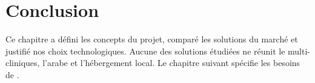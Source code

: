 \section*{Conclusion}
Ce chapitre a défini les concepts du projet, comparé les solutions du marché et justifié nos choix technologiques. Aucune des solutions étudiées ne réunit le multi-cliniques, l'arabe et l'hébergement local. Le chapitre suivant spécifie les besoins de \nomprojet.
